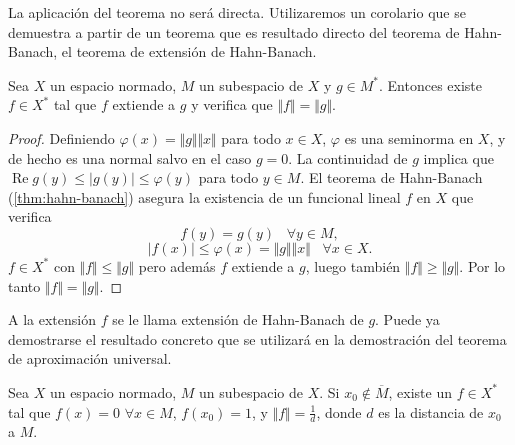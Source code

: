 La aplicación del teorema no será directa. Utilizaremos un corolario que se demuestra a partir de un teorema que es resultado directo del teorema de Hahn-Banach, el teorema de extensión de Hahn-Banach.

\begin{teorema}\label{thm:extension-hahn-banach} Sea $X$ un espacio normado, $M$ un subespacio de $X$ y $g \in M^*$. Entonces existe $f \in X^*$ tal que $f$ extiende a $g$ y verifica que $\Vert f \Vert = \Vert g \Vert$.
\end{teorema}

\begin{proof}
Definiendo $\varphi(x) = \Vert g \Vert \Vert x \Vert$ para todo $x \in X$, $\varphi$ es una seminorma en $X$, y de hecho es una normal salvo en el caso $g = 0$. La continuidad de $g$ implica que $\operatorname{Re}g(y) \leq \vert g(y) \vert \leq \varphi(y)$ para todo $y \in M$. El teorema de Hahn-Banach (\autoref{thm:hahn-banach}) asegura la existencia de un funcional lineal $f$ en $X$ que verifica
$$f(y) = g(y) \;\;\; \forall y \in M,$$
$$\vert f(x) \vert \leq \varphi(x) = \Vert g \Vert \Vert x \Vert \;\;\; \forall x \in X. $$ $f \in X^*$ con $\Vert f \Vert \leq \Vert g \Vert$ pero además $f$ extiende a $g$, luego también $\Vert f \Vert \geq \Vert g \Vert$. Por lo tanto $\Vert f \Vert = \Vert g \Vert$.

\end{proof}

A la extensión $f$ se le llama extensión de Hahn-Banach de $g$. Puede ya demostrarse el resultado concreto que se utilizará en la demostración del teorema de aproximación universal.

\begin{corolario}\label{thm:corolario-hb} Sea $X$ un espacio normado, $M$ un subespacio de $X$. Si $x_0 \notin \overline{M}$, existe un $f \in X^*$ tal que $f(x) = 0$ $\forall x \in M$, $f(x_0) = 1$, y $\Vert f \Vert = \frac{1}{d}$, donde $d$ es la distancia de $x_0$ a $M$.
\end{corolario}

